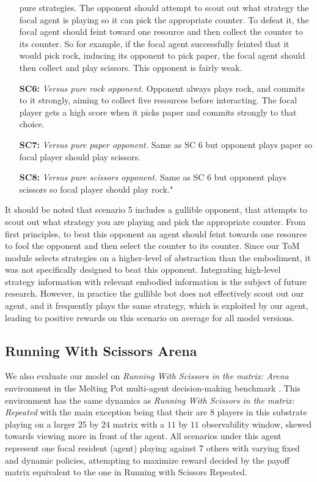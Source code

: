 \documentclass{article} %
\begin{document}
\begin{enumerate}
pure strategies. The opponent should
attempt to scout out what strategy the focal
agent is playing so it can pick the appropriate
counter. To defeat it, the focal agent should feint toward one resource and
then collect the counter to its counter. So
for example, if the focal agent successfully
feinted that it would pick rock, inducing
its opponent to pick paper, the focal agent
should then collect and play scissors. This
opponent is fairly weak.
    \item[\textbf{SC6:}] \textit{Versus pure rock opponent.} Opponent always
plays rock, and commits to it strongly,
aiming to collect five resources before interacting.
The focal player gets a high score
when it picks paper and commits strongly
to that choice.
    \item[\textbf{SC7:}] \textit{Versus pure paper opponent.} Same as SC 6
but opponent plays paper so focal player
should play scissors.
    \item[\textbf{SC8:}] \textit{Versus pure scissors opponent.} Same as SC 6
but opponent plays scissors so focal player
should play rock."
\end{enumerate}

It should be noted that scenario 5 includes a gullible opponent, that attempts to scout out what strategy you are playing and pick the appropriate counter. From first principles, to beat this opponent an agent should feint towards one resource to fool the opponent and then select the counter to its counter. Since our ToM module selects strategies on a higher-level of abstraction than the embodiment, it was not specifically designed to beat this opponent. Integrating high-level strategy information with relevant embodied information is the subject of future research. However, in practice the gullible bot does not effectively scout out our agent, and it frequently plays the same strategy, which is exploited by our agent, leading to positive rewards on this scenario on average for all model versions.

\subsection{Running With Scissors Arena}
We also evaluate our model on \textit{Running With Scissors in the matrix: Arena} environment in the Melting Pot multi-agent decision-making benchmark \citep{agapiou2022melting}. This environment has the same dynamics as \textit{Running With Scissors in the matrix: Repeated} with the main exception being that their are $8$ players in this substrate playing on a larger $25$ by $24$ matrix with a $11$ by $11$ observability window, skewed towards viewing more in front of the agent. All scenarios under this agent represent one focal resident (agent) playing against 7 others with varying fixed and dynamic policies, attempting to maximize reward decided by the payoff matrix equivalent to the one in Running with Scissors Repeated.
\end{document}
